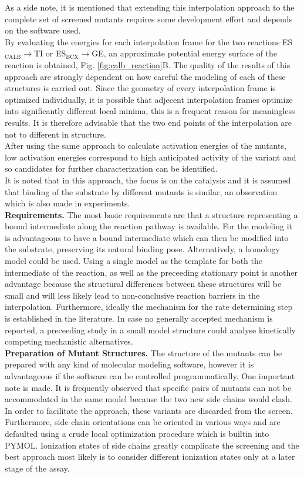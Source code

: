 As a side note, it is mentioned that extending this interpolation approach to the complete set of screened mutants requires some development effort and depends on the software used.\\
By evaluating the energies for each interpolation frame for the two reactions ES$_\text{CALB}\rightarrow$TI or ES$_\text{BCX}\rightarrow$GE, an approximate potential energy surface of the reaction is obtained, Fig. \ref{fig:calb_reaction}B.
The quality of the results of this approach are strongly dependent on how careful the modeling of each of these structures is carried out.
Since the geometry of every interpolation frame is optimized individually, it is possible that adjecent interpolation frames optimize into significantly different local minima, this is a frequent reason for meaningless results.
It is therefore advisable that the two end points of the interpolation are not to different in structure.\\
After using the same approach to calculate activation energies of the mutants, low activation energies correspond to high anticipated activity of the variant and so candidates for further characterization can be identified.\\
It is noted that in this approach, the focus is on the catalysis and it is assumed that binding of the substrate by different mutants is similar, an observation which is also made in experiments\cite{ludwiczek2013strategies}.\\
\textbf{Requirements.}
The most basic requirements are that a structure representing a bound intermediate along the reaction pathway is available.
For the modeling it is advantageous to have a bound intermediate which can then be modified into the substrate, preserving its natural binding pose.
Alternatively, a homology model could be used.
Using a single model as the template for both the intermediate of the reaction, as well as the preceeding stationary point is another advantage because the structural differences between these structures will be small and will less likely lead to non-conclusive reaction barriers in the interpolation.
Furthermore, ideally the mechanism for the rate determining step is established in the literature.
In case no generally accepted mechanism is reported, a preceeding study in a small model structure could analyse kinetically competing mechanistic alternatives.\\
\textbf{Preparation of Mutant Structures.}
The structure of the mutants can be prepared with any kind of molecular modeling software, however it is advantageous if the software can be controlled programmatically.
One important note is made.
It is frequently observed that specific pairs of mutants can not be accommodated in the same model because the two new side chains would clash.
In order to facilitate the approach, these variants are discarded from the screen.
Furthermore, side chain orientations can be oriented in various ways and are defaulted using a crude local optimization procedure which is builtin into PYMOL.
Ionization states of side chains greatly complicate the screening and the best approach most likely is to consider different ionization states only at a later stage of the assay.

